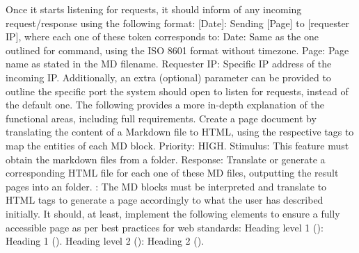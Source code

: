 {}Once it starts listening for requests, it should inform of any incoming request/response using the following format: [Date]: Sending [Page] to [requester IP], where each one of these token corresponds to:\markdownRendererInterblockSeparator
{}\markdownRendererUlBeginTight
\markdownRendererUlItem Date: Same as the one outlined for  command, using the ISO 8601 format without timezone.\markdownRendererUlItemEnd 
\markdownRendererUlItem Page: Page name as stated in the MD filename.\markdownRendererUlItemEnd 
\markdownRendererUlItem Requester IP: Specific IP address of the incoming IP.\markdownRendererUlItemEnd 
\markdownRendererUlEndTight \markdownRendererInterblockSeparator
{}Additionally, an extra (optional) parameter can be provided to outline the specific port the system should open to listen for requests, instead of the default one.\markdownRendererInterblockSeparator
{}\markdownRendererInterblockSeparator
{}The following provides a more in-depth explanation of the functional areas, including full requirements.\markdownRendererInterblockSeparator
{}\markdownRendererInterblockSeparator
{}\markdownRendererInterblockSeparator
{}Create a page document by translating the content of a Markdown file to HTML, using the respective tags to map the entities of each MD block. Priority: HIGH.\markdownRendererInterblockSeparator
{}\markdownRendererInterblockSeparator
{}Stimulus: This feature must obtain the markdown files from a  folder.\markdownRendererInterblockSeparator
{}Response: Translate or generate a corresponding HTML file for each one of these MD files, outputting the result pages into an  folder.\markdownRendererInterblockSeparator
{}: The MD blocks must be interpreted and translate to HTML tags to generate a page accordingly to what the user has described initially. It should, at least, implement the following elements to ensure a fully accessible page as per best practices for web standards:\markdownRendererInterblockSeparator
{}\markdownRendererUlBeginTight
\markdownRendererUlItem Heading level 1 (\markdownRendererCodeSpan{\markdownRendererHash{}}): Heading 1 ().\markdownRendererUlItemEnd 
\markdownRendererUlItem Heading level 2 (\markdownRendererCodeSpan{\markdownRendererHash{}\markdownRendererHash{}}): Heading 2 ().\markdownRendererUlItemEnd 
